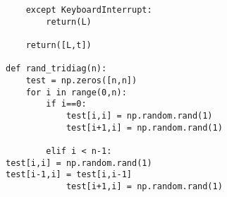 \documentclass[10pt,a4paper]{article}
\begin{document}
\begin{verbatim}
    except KeyboardInterrupt:                                                                                                                                                              
        return(L)                                                                                                                                                                          
                                                                                                                                                                                           
    return([L,t])                                                                                                                                                                          

def rand_tridiag(n):                                                                                                                                                                      
    test = np.zeros([n,n])                                                                                                                                                                 
    for i in range(0,n):                                                                                                                                                                   
        if i==0:                                                                                                                                                                           
            test[i,i] = np.random.rand(1)                                                                                                                                                  
            test[i+1,i] = np.random.rand(1)                                                                                                                                                

        elif i < n-1:                                                                                                                                                                                  test[i,i] = np.random.rand(1)                                                                                                                                                              test[i-1,i] = test[i,i-1]                                                                                                                                                      
            test[i+1,i] = np.random.rand(1)                                                                                                                                                
                                                                                                                                                                                           

\end{verbatim}
\end{document}

